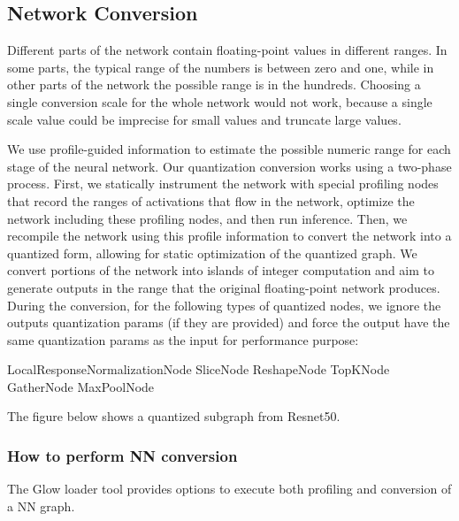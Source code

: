 \subsection*{Network Conversion}

Different parts of the network contain floating-\/point values in different ranges. In some parts, the typical range of the numbers is between zero and one, while in other parts of the network the possible range is in the hundreds. Choosing a single conversion scale for the whole network would not work, because a single scale value could be imprecise for small values and truncate large values.

We use profile-\/guided information to estimate the possible numeric range for each stage of the neural network. Our quantization conversion works using a two-\/phase process. First, we statically instrument the network with special profiling nodes that record the ranges of activations that flow in the network, optimize the network including these profiling nodes, and then run inference. Then, we recompile the network using this profile information to convert the network into a quantized form, allowing for static optimization of the quantized graph. We convert portions of the network into islands of integer computation and aim to generate outputs in the range that the original floating-\/point network produces. During the conversion, for the following types of quantized nodes, we ignore the output\textquotesingle{}s quantization params (if they are provided) and force the output have the same quantization params as the input for performance purpose\+: 
\begin{DoxyCode}
LocalResponseNormalizationNode
SliceNode
ReshapeNode
TopKNode
GatherNode
MaxPoolNode
\end{DoxyCode}


The figure below shows a quantized subgraph from Resnet50.



\subsubsection*{How to perform NN conversion}

The Glow loader tool provides options to execute both profiling and conversion of a NN graph.


